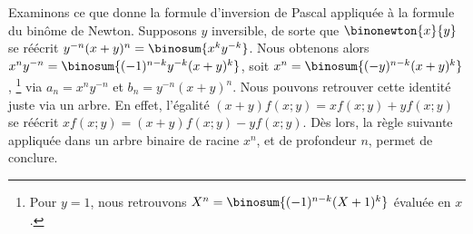 \begin{remark}
    Examinons ce que donne la formule d'inversion de Pascal appliquée à la formule du binôme de Newton.
    Supposons $y$ inversible, de sorte que $\binonewton{x}{y}$ se réécrit $y^{-n}(x+y)^n = \binosum{x^k y^{-k}}$.
    Nous obtenons alors $x^n y^{-n} = \binosum{(-1)^{n-k} y^{-k} (x+y)^k}$,
    soit $x^n = \binosum{(- y)^{n-k} (x+y)^k}$,%
    \footnote{
    	Pour $y = 1$, nous retrouvons
		$X^n = \binosum{(-1)^{n-k} (X+1)^k}$
		évaluée en $x$.
    }
    via
    $a_ n = x^n y^{-n}$
    et
    $b_ n = y^{-n}(x+y)^n$.
    Nous pouvons retrouver cette identité juste via un arbre.
    En effet,
    l'égalité
    $(x + y)f(x ; y) = x f(x ; y) + y f(x ; y)$ se réécrit $x f(x ; y) = (x + y)f(x ; y) - y f(x ; y)$.
    Dès lors,
    la règle suivante appliquée dans un arbre binaire de racine $x^n$, et de profondeur $n$, permet de conclure.
    
                {\intertree}{}
\end{remark}
